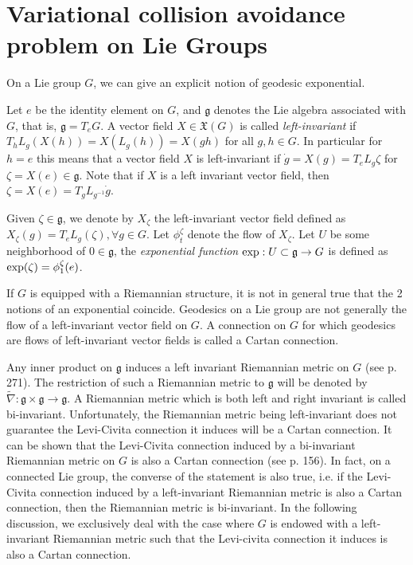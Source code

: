 \documentclass[letterpaper, 10 pt, conference]{ieeeconf}  %
\begin{document}
%
%

\section{Variational collision avoidance problem on Lie Groups}
\label{S:4}

On a Lie group $G$, we can give an explicit notion of geodesic exponential.

Let $e$ be the identity element on $G$, and $\mathfrak{g}$ denotes the Lie algebra associated with $G$, that is, $\mathfrak{g}=T_{e}G$. A vector field $X\in\mathfrak{X}(G)$ is called \textit{left-invariant} if $T_{h}L_g(X(h))=X(L_g(h))=X(gh)$ for all $g,h\in G$. In particular for $h=e$ this means that a vector field $X$ is left-invariant if $\dot{g}=X(g)=T_{e}L_{g}\zeta$ for $\zeta=X(e)\in\mathfrak{g}$. Note that if $X$ is a left invariant vector field, then $\zeta=X(e)=T_{g}L_{g^{-1}}\dot{g}$.   

Given $\zeta \in \mathfrak{g}$, we denote by $X_\zeta$ the left-invariant vector field defined as $X_\zeta (g) = T_eL_g(\zeta), \forall g \in G$. Let $\phi^\zeta_t $ denote the flow of $X_\zeta$. Let $U$ be some neighborhood of $0 \in \mathfrak{g}$, the \textit{exponential function} $\hbox{exp}: U \subset \mathfrak{g} \rightarrow G$ is defined as $\hbox{exp}(\zeta) = \phi^\zeta_1(e)$. 

If $G$ is equipped with a Riemannian structure, it is not in general true that the 2 notions of an exponential coincide. Geodesics on a Lie group are not generally the flow of a left-invariant vector field on $G$. A connection on $G$ for which geodesics are flows of left-invariant vector fields is called a Cartan connection.

Any inner product on $\mathfrak{g}$ induces a left invariant Riemannian metric on $G$ (see \cite{bookBullo} p. 271). The restriction of such a Riemannian metric to $\mathfrak{g}$ will be denoted by $\widetilde{\nabla} : \mathfrak{g} \times \mathfrak{g} \rightarrow  \mathfrak{g}$. A Riemannian metric which is both left and right invariant is called bi-invariant. Unfortunately, the Riemannian metric being left-invariant does not guarantee the Levi-Civita connection it induces will be a Cartan connection. It can be shown that the Levi-Civita connection induced by a bi-invariant Riemannian metric on $G$ is also a Cartan connection (see \cite{sternberg2013curvature} p. 156). In fact, on a connected Lie group, the converse of the statement is also true, i.e. if the Levi-Civita connection induced by a left-invariant Riemannian metric is also a Cartan connection, then the Riemannian metric is bi-invariant. In the following discussion, we exclusively deal with the case where $G$ is endowed with a left-invariant Riemannian metric such that the Levi-civita connection it induces is also a Cartan connection.
\end{document}
